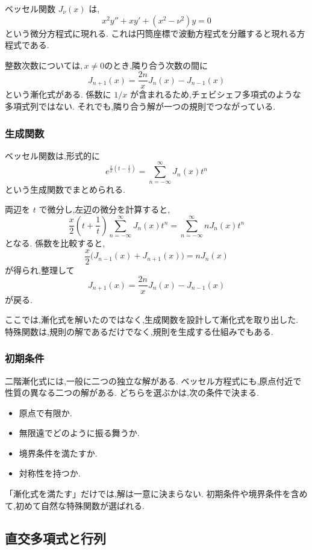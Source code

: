 ベッセル関数 $J_\nu(x)$ は,
\[
  x^2y''+xy'+(x^2-\nu^2)y=0
\]
という微分方程式に現れる.
これは円筒座標で波動方程式を分離すると現れる方程式である.

整数次数については,\,$x\ne0$のとき,隣り合う次数の間に
\[
  J_{n+1}(x)
  =\frac{2n}{x}J_n(x)-J_{n-1}(x)
\]
という漸化式がある.
係数に $1/x$ が含まれるため,チェビシェフ多項式のような多項式列ではない.
それでも,隣り合う解が一つの規則でつながっている.

\subsubsection{生成関数}

ベッセル関数は,形式的に
\[
  e^{\frac{x}{2}\left(t-\frac1t\right)}
  =\sum_{n=-\infty}^{\infty}J_n(x)t^n
\]
という生成関数でまとめられる.

両辺を $t$ で微分し,左辺の微分を計算すると,
\[
  \frac{x}{2}\left(t+\frac1t\right)
  \sum_{n=-\infty}^{\infty}J_n(x)t^n
  =
  \sum_{n=-\infty}^{\infty}nJ_n(x)t^n
\]
となる.
係数を比較すると,
\[
  \frac{x}{2}\bigl(J_{n-1}(x)+J_{n+1}(x)\bigr)
  =nJ_n(x)
\]
が得られ,整理して
\[
  J_{n+1}(x)=\frac{2n}{x}J_n(x)-J_{n-1}(x)
\]
が戻る.

ここでは,漸化式を解いたのではなく,生成関数を設計して漸化式を取り出した.
特殊関数は,規則の解であるだけでなく,規則を生成する仕組みでもある.

\subsubsection{初期条件}

二階漸化式には,一般に二つの独立な解がある.
ベッセル方程式にも,原点付近で性質の異なる二つの解がある.
どちらを選ぶかは,次の条件で決まる.

\begin{itemize}
  \item 原点で有限か.
  \item 無限遠でどのように振る舞うか.
  \item 境界条件を満たすか.
  \item 対称性を持つか.
\end{itemize}

「漸化式を満たす」だけでは,解は一意に決まらない.
初期条件や境界条件を含めて,初めて自然な特殊関数が選ばれる.

\subsection{直交多項式と行列}

